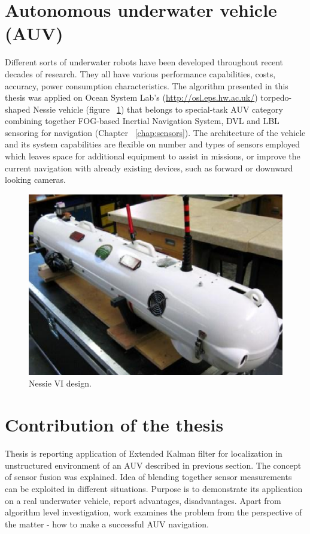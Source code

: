 \section{Autonomous underwater vehicle (AUV)}
Different sorts of underwater robots have been developed throughout recent decades of research. They all have various performance capabilities, costs, accuracy, power consumption characteristics. The algorithm presented in this thesis was applied on Ocean System Lab's (\url{http://osl.eps.hw.ac.uk/}) torpedo-shaped Nessie vehicle (figure ~\ref{fig:nessie6}) that belongs to special-task AUV category combining together FOG-based Inertial Navigation System, DVL and LBL sensoring for navigation (Chapter ~\ref{chap:sensors}). The architecture of the vehicle and its system capabilities are flexible on number and types of sensors employed which leaves space for additional equipment to assist in missions, or improve the current navigation with already existing devices, such as forward or downward looking cameras. 
\begin{figure}%
\centering
\includegraphics[width=0.5\linewidth]{intro/fig/nessie6.eps}
\caption{Nessie VI design.}
\label{fig:nessie6}
\end{figure} 

\section{Contribution of the thesis}
Thesis is reporting application of Extended Kalman filter for localization in unstructured environment of an AUV described in previous section. The concept of sensor fusion was explained. Idea of blending together sensor measurements can be exploited in different situations. Purpose is to demonstrate its application on a real underwater vehicle, report advantages, disadvantages. Apart from algorithm level investigation, work examines the problem from the perspective of the matter - how to make a successful AUV navigation. 
